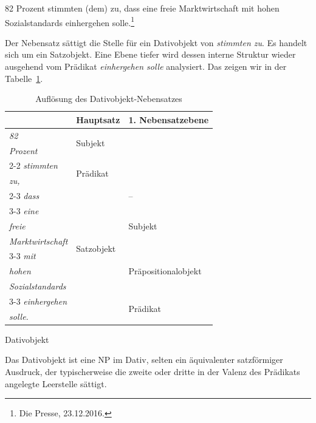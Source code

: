 \ea \label{ea:DatNeSa} 82 Prozent stimmten (dem) zu, dass eine freie Marktwirtschaft mit hohen Sozialstandards einhergehen solle.\footnote{Die Presse, 23.12.2016.} 
\z 

Der Nebensatz sättigt die Stelle für ein Dativobjekt von \textit{stimmten zu}. Es handelt sich um ein Satzobjekt. Eine Ebene tiefer wird dessen interne Struktur wieder ausgehend vom Prädikat \textit{einhergehen solle} analysiert. Das zeigen wir in der Tabelle~\ref{tab:DatObjNS}. 


\begin{table}
  \centering
  \begin{tabular}{l|l|l}
     & Hauptsatz & 1. Nebensatzebene \\
    \hline
    \textit{82} & \multirow{2}{*}{Subjekt} & \\
    \textit{Prozent} & &  \\ \cline{2-2}
    \textit{stimmten} & \multirow{2}{*}{Prädikat} \\ 
    \textit{zu,} & &  \\ \cline{2-3}
    \textit{dass} & \multirow{8}{*}{Satzobjekt} & -- \\ \cline{3-3} 
    \textit{eine} & & \multirow{3}{*}{Subjekt}  \\ 
    \textit{freie} & & \\ 
    \textit{Marktwirtschaft} & & \\ \cline{3-3}
    \textit{mit} & & \multirow{3}{*}{Präpositionalobjekt} \\ 
    \textit{hohen} & & \\
    \textit{Sozialstandards} & & \\ \cline{3-3}
    \textit{einhergehen} & & \multirow{2}{*}{Prädikat} \\ 
    \textit{solle.} & & \\
    \hline 
  \end{tabular}
  \caption{Auflösung des Dativobjekt-Nebensatzes}
  \label{tab:DatObjNS}
\end{table}


\begin{Definition}{Dativobjekt}
    
\noindent Das Dativobjekt ist eine NP im Dativ, selten ein äquivalenter satzförmiger Ausdruck, der typischerweise die zweite oder dritte in der Valenz des Prädikats angelegte Leerstelle sättigt.  
\end{Definition}



